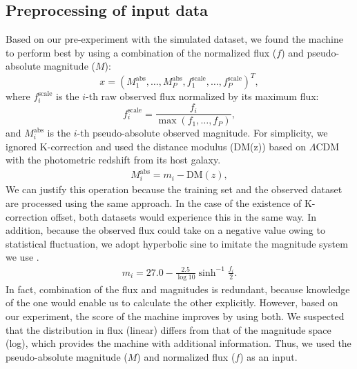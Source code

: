 \documentclass[useamsfonts]{pasj01}
\begin{document}
\subsection{Preprocessing of input data}
\label{sec:preproc}
Based on our pre-experiment with the simulated dataset, we found the machine to perform best by using a combination of the normalized flux ($f$) and pseudo-absolute magnitude ($M$):
\begin{equation}
    x = \left( M_1^\mathrm{abs}, \ldots, M_P^\mathrm{abs}, f_{1}^{\mathrm{scale}}, \ldots, f_{P}^{\mathrm{scale}} \right)^T,
\end{equation}
where $f_{i}^{\mathrm{scale}}$ is the $i$-th raw observed flux normalized by its maximum flux:
\begin{equation}
    f_{i}^{\mathrm{scale}} = \frac{f_i}{\max \left(f_1, \ldots, f_P \right)},    \label{eq:scaled_flux}
\end{equation}
and $M_i^\mathrm{abs}$ is the $i$-th pseudo-absolute observed magnitude.
For simplicity, we ignored K-correction and used the distance modulus (DM(z)) based on $\Lambda$CDM with the photometric redshift from its host galaxy.
\begin{eqnarray}
    M_i^\mathrm{abs} = m_i - \mathrm{DM}\left(z\right),
\end{eqnarray}
We can justify this operation because the training set and the observed dataset are processed using the same approach.
In the case of the existence of K-correction offset, both datasets would experience this in the same way.
In addition, because the observed flux could take on a negative value owing to statistical fluctuation, 
we adopt hyperbolic sine to imitate the magnitude system we use \citep{lupton99a}.  
\begin{eqnarray}
    m_i = 27.0 - \frac{2.5}{\log 10} \sinh^{-1} \frac{f_i}{2}. \label{eq:mag} 
\end{eqnarray}
In fact, combination of the flux and magnitudes is redundant, because knowledge of the one would enable us to calculate the other explicitly.   
However, based on our experiment, the score of the machine improves by using both.  
We suspected that the distribution in flux (linear) differs from that of the magnitude space (log), which provides the machine with additional information.
Thus, we used the pseudo-absolute magnitude ($M$) and normalized flux ($f$) as an input.
\end{document}
